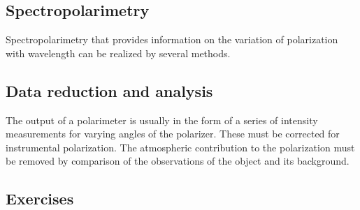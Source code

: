 \documentclass{article}
\begin{document}
\subsection{Spectropolarimetry}

Spectropolarimetry that provides information on the variation of polarization with wavelength can be realized by several methods. 

\subsection{Data reduction and analysis}

The output of a polarimeter is usually in the form of a series of
intensity measurements for varying angles of the polarizer. These must
be corrected for instrumental polarization. The atmospheric
contribution to the polarization must be removed by comparison of the
observations of the object  and its background. 

\subsection{Exercises}
\end{document}

